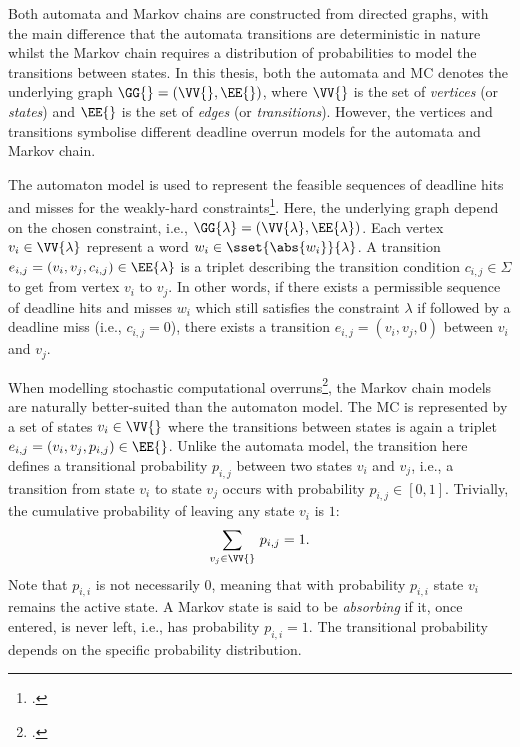 Both automata and Markov chains are constructed from directed graphs, with the main difference that the automata transitions are deterministic in nature whilst the Markov chain requires a distribution of probabilities to model the transitions between states.
In this thesis, both the automata and MC denotes the underlying graph $\GG{} = (\VV{}, \EE{})$, where $\VV{}$ is the set of \emph{vertices} (or \emph{states}) and $\EE{}$ is the set of \emph{edges} (or \emph{transitions}).
However, the vertices and transitions symbolise different deadline overrun models for the automata and Markov chain.

The automaton model is used to represent the feasible sequences of deadline hits and misses for the weakly-hard constraints\footnote{.}.
Here, the underlying graph depend on the chosen constraint, i.e., $\GG{\lambda} = (\VV{\lambda}, \EE{\lambda})$.
Each vertex $v_i \in \VV{\lambda}$ represent a word $w_i \in \sset{\abs{w_i}}{\lambda}$.
A transition $e_{i, j} = (v_i, v_j, c_{i,j}) \in \EE{\lambda}$ is a triplet describing the transition condition $c_{i,j} \in \Sigma$ to get from vertex $v_i$ to $v_j$.
In other words, if there exists a permissible sequence of deadline hits and misses $w_i$ which still satisfies the constraint $\lambda$ if followed by a deadline miss (i.e., $c_{i,j} = 0$), there exists a transition $e_{i,j} = (v_i, v_j, 0)$ between $v_i$ and $v_j$.

When modelling stochastic computational overruns\footnote{.}, the Markov chain models are naturally better-suited than the automaton model.
The MC is represented by a set of states $v_i \in \VV{}$ where the transitions between states is again a triplet $e_{i, j} = (v_i, v_j, p_{i, j}) \in \EE{}$.
Unlike the automata model, the transition here defines a transitional probability $p_{i, j}$ between two states $v_i$ and $v_j$, i.e., a transition from state $v_i$ to state $v_j$ occurs with probability $p_{i, j} \in [0, 1]$.
Trivially, the cumulative probability of leaving any state $v_i$ is $1$:
%
\begin{equation}
    \sum_{v_j\in\VV{}}\, p_{i, j} = 1.
\end{equation}
%
Note that $p_{i, i}$ is not necessarily $0$, meaning that with probability $p_{i, i}$ state $v_i$ remains the active state.
A Markov state is said to be \emph{absorbing} if it, once entered, is never left, i.e., has probability $p_{i, i} = 1$.
The transitional probability depends on the specific probability distribution.

